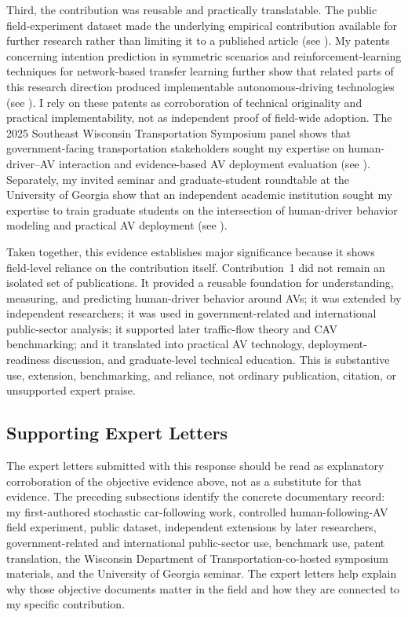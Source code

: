 \documentclass[11pt,letterpaper]{article}
\begin{document}
Third, the contribution was reusable and practically translatable. The public field-experiment dataset made the underlying empirical contribution available for further research rather than limiting it to a published article (see ). My patents concerning intention prediction in symmetric scenarios and reinforcement-learning techniques for network-based transfer learning further show that related parts of this research direction produced implementable autonomous-driving technologies (see ). I rely on these patents as corroboration of technical originality and practical implementability, not as independent proof of field-wide adoption. The 2025 Southeast Wisconsin Transportation Symposium panel shows that government-facing transportation stakeholders sought my expertise on human-driver--AV interaction and evidence-based AV deployment evaluation (see ). Separately, my invited seminar and graduate-student roundtable at the University of Georgia show that an independent academic institution sought my expertise to train graduate students on the intersection of human-driver behavior modeling and practical AV deployment (see ).

Taken together, this evidence establishes major significance because it shows field-level reliance on the contribution itself. Contribution~1 did not remain an isolated set of publications. It provided a reusable foundation for understanding, measuring, and predicting human-driver behavior around AVs; it was extended by independent researchers; it was used in government-related and international public-sector analysis; it supported later traffic-flow theory and CAV benchmarking; and it translated into practical AV technology, deployment-readiness discussion, and graduate-level technical education. This is substantive use, extension, benchmarking, and reliance, not ordinary publication, citation, or unsupported expert praise.

\subsection{Supporting Expert Letters}

The expert letters submitted with this response should be read as explanatory corroboration of the objective evidence above, not as a substitute for that evidence. The preceding subsections identify the concrete documentary record: my first-authored stochastic car-following work, controlled human-following-AV field experiment, public dataset, independent extensions by later researchers, government-related and international public-sector use, benchmark use, patent translation, the Wisconsin Department of Transportation-co-hosted symposium materials, and the University of Georgia seminar. The expert letters help explain why those objective documents matter in the field and how they are connected to my specific contribution.
\end{document}
